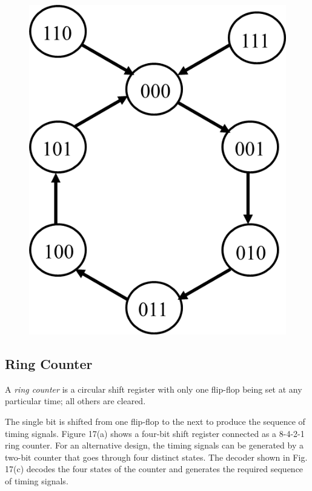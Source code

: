 \begin{figure}[H]
\begin{minipage}{0.49\linewidth}
    \includegraphics[width=\linewidth]{img/self-starting-counter-diagram.png}
    \label{fig:self-starting-counter-diagram.png.png}
  \end{minipage}
\end{figure}

\subsection{Ring Counter}
\label{subsec:ring-counter}

A \textit{ring counter} is a circular shift register with only one flip-flop being set at any particular time; all others are cleared.

The single bit is shifted from one flip-flop to the next to produce the 
sequence of timing signals. Figure 17(a) shows a four-bit shift register connected as a 8-4-2-1 ring counter. For an alternative design, the timing signals can be generated by a two-bit counter that goes through four distinct states. The decoder shown in Fig. 17(c) decodes the four states of the counter and generates the required sequence of timing signals.


